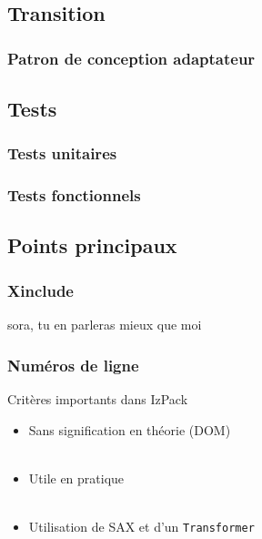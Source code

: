 \subsection{Transition}
\begin{frame}\frametitle{Patron de conception adaptateur}

\end{frame}
\subsection{Tests}
\begin{frame}\frametitle{Tests unitaires}

\end{frame}
\begin{frame}\frametitle{Tests fonctionnels}

\end{frame}
\subsection{Points principaux}
\begin{frame}\frametitle{Xinclude}
sora, tu en parleras mieux que moi
\end{frame}
\begin{frame}\frametitle{Numéros de ligne}
\begin{beamerboxesrounded}[shadow=true]{Critères importants dans IzPack}
\begin{itemize}
	\item Sans signification en théorie (DOM)\\
	~\\
	\item Utile en pratique\\
	~\\
	\item Utilisation de SAX et d'un \verb|Transformer|
\end{itemize}
\end{beamerboxesrounded}
\end{frame}
